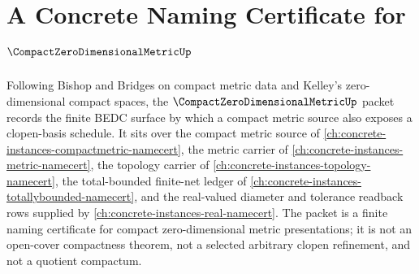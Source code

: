 \chapter{A Concrete Naming Certificate for $\CompactZeroDimensionalMetricUp$}
\label{ch:concrete-instances-compact-zero-dimensional-metric-namecert}

Following Bishop and Bridges on compact metric data and Kelley's zero-dimensional compact spaces, the $\CompactZeroDimensionalMetricUp$ packet records the finite BEDC surface by which a compact metric source also exposes a clopen-basis schedule. It sits over the compact metric source of \autoref{ch:concrete-instances-compactmetric-namecert}, the metric carrier of \autoref{ch:concrete-instances-metric-namecert}, the topology carrier of \autoref{ch:concrete-instances-topology-namecert}, the total-bounded finite-net ledger of \autoref{ch:concrete-instances-totallybounded-namecert}, and the real-valued diameter and tolerance readback rows supplied by \autoref{ch:concrete-instances-real-namecert}. The packet is a finite naming certificate for compact zero-dimensional metric presentations; it is not an open-cover compactness theorem, not a selected arbitrary clopen refinement, and not a quotient compactum.

